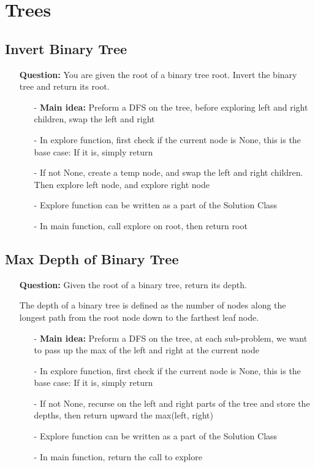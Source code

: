 \documentclass[12pt]{article}
\begin{document}
\section{Trees}

\subsection{Invert Binary Tree}
\begin{enumerate}
  \item[] \textbf{Question:} You are given the root of a binary tree root. Invert the binary tree and return its root. 

    \begin{enumerate}
      \item[-] \textbf{Main idea:} Preform a DFS on the tree, before exploring left and right children, swap the left and right 
      \item[-] In explore function, first check if the current node is None, this is the base case: If it is, simply return 
      \item[-] If not None, create a temp node, and swap the left and right children. Then explore left node, and explore right node
      \item[-] Explore function can be written as a part of the Solution Class
      \item[-] In main function, call explore on root, then return root


    \end{enumerate}
\end{enumerate}


\subsection{Max Depth of Binary Tree}
\begin{enumerate}
  \item[] \textbf{Question:} Given the root of a binary tree, return its depth.

The depth of a binary tree is defined as the number of nodes along the longest path from the root node down to the farthest leaf node.

    \begin{enumerate}
      \item[-] \textbf{Main idea:} Preform a DFS on the tree, at each sub-problem, we want to pass up the max of the left and right at the current node
      \item[-] In explore function, first check if the current node is None, this is the base case: If it is, simply return 
      \item[-] If not None, recurse on the left and right parts of the tree and store the depths, then return upward the max(left, right)
      \item[-] Explore function can be written as a part of the Solution Class
      \item[-] In main function, return the call to explore


    \end{enumerate}
\end{enumerate}
\end{document}
